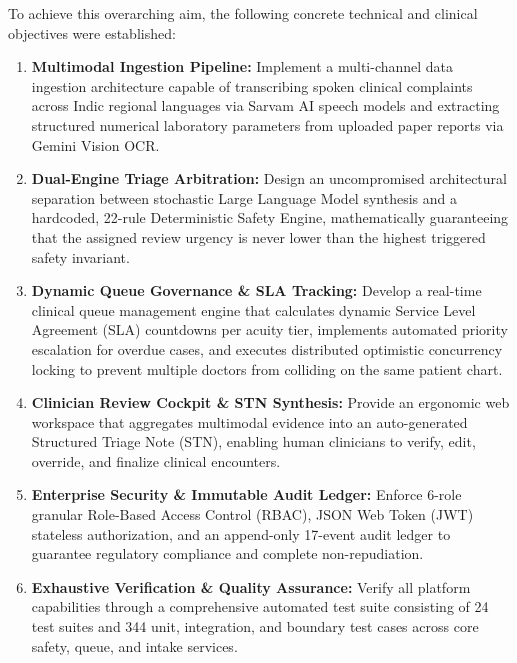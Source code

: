 \documentclass[11pt,a4paper,oneside]{report}
\begin{document}
To achieve this overarching aim, the following concrete technical and clinical objectives were established:
\begin{enumerate}[leftmargin=20pt]
  \item \textbf{Multimodal Ingestion Pipeline:} Implement a multi-channel data ingestion architecture capable of transcribing spoken clinical complaints across Indic regional languages via Sarvam AI speech models and extracting structured numerical laboratory parameters from uploaded paper reports via Gemini Vision OCR.
  \item \textbf{Dual-Engine Triage Arbitration:} Design an uncompromised architectural separation between stochastic Large Language Model synthesis and a hardcoded, 22-rule Deterministic Safety Engine, mathematically guaranteeing that the assigned review urgency is never lower than the highest triggered safety invariant.
  \item \textbf{Dynamic Queue Governance \& SLA Tracking:} Develop a real-time clinical queue management engine that calculates dynamic Service Level Agreement (SLA) countdowns per acuity tier, implements automated priority escalation for overdue cases, and executes distributed optimistic concurrency locking to prevent multiple doctors from colliding on the same patient chart.
  \item \textbf{Clinician Review Cockpit \& STN Synthesis:} Provide an ergonomic web workspace that aggregates multimodal evidence into an auto-generated Structured Triage Note (STN), enabling human clinicians to verify, edit, override, and finalize clinical encounters.
  \item \textbf{Enterprise Security \& Immutable Audit Ledger:} Enforce 6-role granular Role-Based Access Control (RBAC), JSON Web Token (JWT) stateless authorization, and an append-only 17-event audit ledger to guarantee regulatory compliance and complete non-repudiation.
  \item \textbf{Exhaustive Verification \& Quality Assurance:} Verify all platform capabilities through a comprehensive automated test suite consisting of 24 test suites and 344 unit, integration, and boundary test cases across core safety, queue, and intake services.
\end{enumerate}
\end{document}
